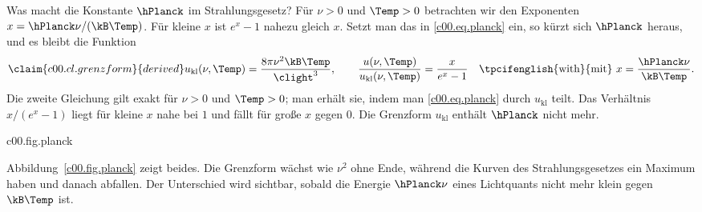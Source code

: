 Was macht die Konstante $\hPlanck$ im Strahlungsgesetz? Für $\nu > 0$ und $\Temp > 0$
betrachten wir den Exponenten $x = \hPlanck\nu/(\kB \Temp)$. Für kleine $x$ ist $e^x - 1$
nahezu gleich $x$. Setzt man das in \eqref{c00.eq.planck} ein, so kürzt sich $\hPlanck$
heraus, und es bleibt die Funktion
\begin{equation}\label{c00.eq.grenzform}\claim{c00.cl.grenzform}{derived}
  u_{\mathrm{kl}}(\nu, \Temp) = \frac{8\pi \nu^2 \kB \Temp}{\clight^3},
  \qquad
  \frac{u(\nu, \Temp)}{u_{\mathrm{kl}}(\nu, \Temp)} = \frac{x}{e^{x} - 1}
  \quad \text{\tpcifenglish{with}{mit}}\ x = \frac{\hPlanck\nu}{\kB \Temp} .
\end{equation}
Die zweite Gleichung gilt exakt für $\nu > 0$ und $\Temp > 0$; man erhält sie, indem man
\eqref{c00.eq.planck} durch $u_{\mathrm{kl}}$ teilt. Das Verhältnis $x/(e^x - 1)$ liegt für
kleine $x$ nahe bei $1$ und fällt für große $x$ gegen $0$. Die Grenzform
$u_{\mathrm{kl}}$ enthält $\hPlanck$ nicht mehr.

\begin{tpcfigure}{c00.fig.planck}
  \caption{Das Strahlungsgesetz~\eqref{c00.eq.planck} und seine Grenzform
    \eqref{c00.eq.grenzform}. (a) Die Energiedichte $u$ für drei Temperaturen $T_0$,
    $\tfrac56 T_0$ und $\tfrac23 T_0$ (durchgezogen, gestrichelt, strichpunktiert),
    aufgetragen gegen $\hPlanck\nu/(\kB T_0)$ in Einheiten von
    $u_0 = 8\pi(\kB T_0)^3/(\hPlanck^2\clight^3)$. Die dünn gestrichelte Parabel ist
    die Grenzform $u_{\mathrm{kl}}$ für die höchste Temperatur $T_0$. Achten Sie darauf,
    dass sie bei kleinen Frequenzen näherungsweise auf der durchgezogenen Kurve liegt, zu
    der sie gehört, und sich erst dann von ihr löst; danach läuft sie nach oben aus dem Bild.
    (b) Das Verhältnis $u/u_{\mathrm{kl}} = x/(e^x-1)$ für $\nu > 0$ und $\Temp > 0$.
    Es hängt nur von $x = \hPlanck\nu/(\kB\Temp)$ ab. Die schraffierte Fläche ist der
    Abstand zur Grenzform. Er wird merklich, sobald $\hPlanck\nu$ die Größe von
    $\kB\Temp$ erreicht.}
\end{tpcfigure}

Abbildung~\ref{c00.fig.planck} zeigt beides. Die Grenzform wächst wie $\nu^2$ ohne Ende,
während die Kurven des Strahlungsgesetzes ein Maximum haben und danach abfallen. Der
Unterschied wird sichtbar, sobald die Energie $\hPlanck\nu$ eines Lichtquants nicht mehr
klein gegen $\kB\Temp$ ist.


